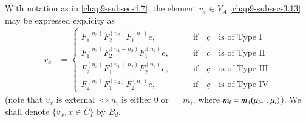 \subsection{}\label{chap9-subsec-4.8}
With notation as in \ref{chap9-subsec-4.7}, the element $v_{x}\in V_{A}$ \eqref{chap9-subsec-3.13} may be expressed explicity as
\begin{align*}
v_{x} &=
\begin{cases}
F_{1}^{(n_{3})} F_{2}^{(n_{2})}F_{1}^{(n_{1})} e,\qquad &\text{if}\quad \underline{c}\quad \text{is of  Type I}\\
F_{1}^{(n_{3})} F_{2}^{(n_{1}+n_{2})}F_{1}^{(n_{2})} e,\qquad &\text{if}\quad \underline{c} \quad\text{is of  Type II}\\
F_{2}^{(n_{3})} F_{1}^{(n_{1}+n_{2})}F_{2}^{(n_{2})} e,\qquad &\text{if}\quad \underline{c}\quad \text{is of  Type III}\\
F_{2}^{(n_{3})} F_{1}^{(n_{2})}F_{2}^{(n_{1})} e,\qquad &\text{if}\quad \underline{c}\quad \text{is of  Type IV}
\end{cases}
\end{align*}
(note that $v_{x}$ is external $\Longleftrightarrow  n_{i}$ is either 0 or $= m_{i}$, where $m_{i}= m_{\lambda}(\mu_{i-1},\break \mu_{i})$). We shall denote $\{v_{x}, x  \in \overline{C}\}$ by $B_{d}$. 

